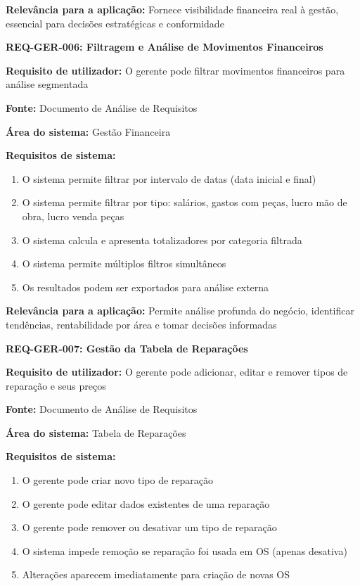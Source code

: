 \documentclass[11pt,a4paper]{article}
\newcommand{\reqheader}[1]{{\noindent\large\bfseries\color{sectionblue}#1}\par\vspace{0.3cm}}
\newcommand{\reqfield}[2]{{\noindent\textbf{#1:} #2}\par\vspace{0.2cm}}
\begin{document}
\reqfield{Relevância para a aplicação}{Fornece visibilidade financeira real à gestão, essencial para decisões estratégicas e conformidade}

\vspace{0.8cm}

\reqheader{REQ-GER-006: Filtragem e Análise de Movimentos Financeiros}

\reqfield{Requisito de utilizador}{O gerente pode filtrar movimentos financeiros para análise segmentada}

\reqfield{Fonte}{Documento de Análise de Requisitos}

\reqfield{Área do sistema}{Gestão Financeira}

\reqfield{Requisitos de sistema}{
	\begin{enumerate}
		\item O sistema permite filtrar por intervalo de datas (data inicial e final)
		\item O sistema permite filtrar por tipo: salários, gastos com peças, lucro mão de obra, lucro venda peças
		\item O sistema calcula e apresenta totalizadores por categoria filtrada
		\item O sistema permite múltiplos filtros simultâneos
		\item Os resultados podem ser exportados para análise externa
	\end{enumerate}
}

\reqfield{Relevância para a aplicação}{Permite análise profunda do negócio, identificar tendências, rentabilidade por área e tomar decisões informadas}

\vspace{0.8cm}

\reqheader{REQ-GER-007: Gestão da Tabela de Reparações}

\reqfield{Requisito de utilizador}{O gerente pode adicionar, editar e remover tipos de reparação e seus preços}

\reqfield{Fonte}{Documento de Análise de Requisitos}

\reqfield{Área do sistema}{Tabela de Reparações}

\reqfield{Requisitos de sistema}{
	\begin{enumerate}
		\item O gerente pode criar novo tipo de reparação
		\item O gerente pode editar dados existentes de uma reparação
		\item O gerente pode remover ou desativar um tipo de reparação
		\item O sistema impede remoção se reparação foi usada em OS (apenas desativa)
		\item Alterações aparecem imediatamente para criação de novas OS
	\end{enumerate}
}
\end{document}
